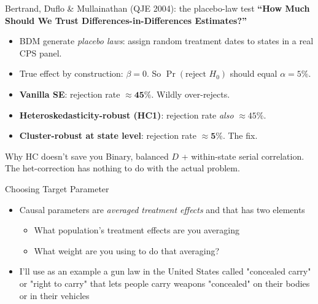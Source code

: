 \documentclass[aspectratio=169,11pt]{beamer}
\begin{document}
\begin{frame}{Bertrand, Duflo \& Mullainathan (QJE 2004): the placebo-law test}
\vspace{0.4em}
\textbf{``How Much Should We Trust Differences-in-Differences Estimates?''}
\vspace{0.4em}
\begin{itemize}\small
  \item BDM generate \textit{placebo laws}: assign random treatment dates to states in a real CPS panel.
  \item True effect by construction: $\beta = 0$. So $\Pr(\text{reject } H_0)$ should equal $\alpha = 5\%$.
  \item \textbf{Vanilla SE}: rejection rate $\approx \mathbf{45\%}$. Wildly over-rejects.
  \item \textbf{Heteroskedasticity-robust (HC1)}: rejection rate \textit{also} $\approx 45\%$. 
  \item \textbf{Cluster-robust at state level}: rejection rate $\approx \mathbf{5\%}$. \;The fix.
\end{itemize}
\vspace{0.4em}
\begin{block}{Why HC doesn't save you}
\small
Binary, balanced $D$ + within-state serial correlation. \;The het-correction has nothing to do with the actual problem. \;
\end{block}
\end{frame}


\begin{frame}{Choosing Target Parameter}

\begin{itemize}
\item Causal parameters are \emph{averaged treatment effects} and that has two elements
	\begin{itemize}
	\item What population's treatment effects are you averaging
	\item What weight are you using to do that averaging?
	\end{itemize}
\item I'll use as an example a gun law in the United States called "concealed carry" or "right to carry" that lets people carry weapons "concealed" on their bodies or in their vehicles 
\end{itemize}

\end{frame}
\end{document}
